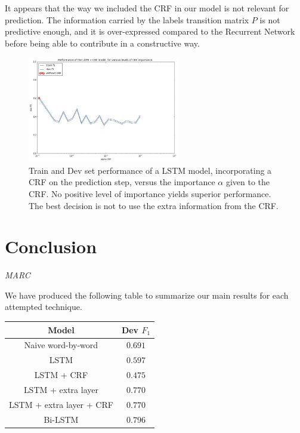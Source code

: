 \documentclass{article} %
\begin{document}
It appears that the way we included the CRF in our model is not relevant for prediction. The information carried by the labels transition matrix $P$ is not predictive enough, and it is over-expressed compared to the Recurrent Network before being able to contribute in a constructive way. 

\begin{figure}
\begin{center}
\includegraphics[width=250px]{figs/LSTM-CRF-vs-alpha.png}
\caption{Train and Dev set performance of a LSTM model, incorporating a CRF on the prediction step, versus the importance $\alpha$ given to the CRF. No positive level of importance yields superior performance. The best decision is not to use the extra information from the CRF. }
\label{lstm-crf-results}
\end{center}
\end{figure}

\section{Conclusion}
\textit{MARC}

We have produced the following table to summarize our main results for each attempted technique.

\begin{center}
 \begin{tabular}{||c | c||}
 \hline
 Model  & Dev $F_1$ \\
 \hline\hline
 Naive word-by-word & $0.691$ \\
 \hline
 LSTM & $0.597$ \\
 \hline
 LSTM + CRF & $0.475$ \\
 \hline
 LSTM + extra layer & $0.770$ \\
 \hline
 LSTM + extra layer + CRF & $0.770$ \\
 \hline
 Bi-LSTM & $0.796$ \\ [1ex]
 \hline
\end{tabular}
\end{center}
\end{document}
